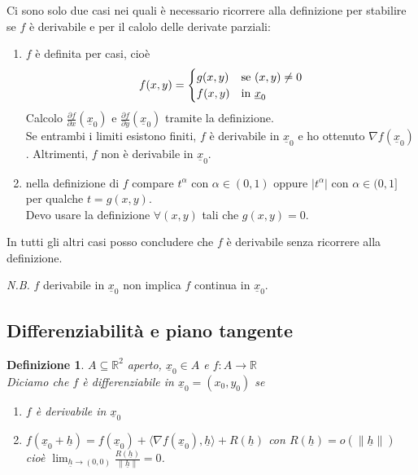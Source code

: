 \documentclass{scrreprt}
\newtheorem{defn}{Definizione}
\newenvironment{definition}{\begin{mdframed}[backgroundcolor=Ivory2]\begin{defn}}{\end{defn}\end{mdframed}}
\begin{document}
Ci sono solo due casi nei quali è necessario ricorrere alla definizione per stabilire se $f$ è derivabile e per il calolo delle derivate parziali:
\begin{enumerate}
	\item $f$ è definita per casi, cioè
	\begin{equation}
		f(x,y) = \begin{cases} g(x,y) & \textnormal{se } (x,y) \neq 0 \\ f(x,y) & \textnormal{in } \underline{x}_0 \end{cases}
	\end{equation}
	Calcolo $\frac{\partial f}{\partial x}(\underline{x}_0)$ e $\frac{\partial f}{\partial y}(\underline{x}_0)$ tramite la definizione.\\
	Se entrambi i limiti esistono finiti, $f$ è derivabile in $\underline{x}_0$ e ho ottenuto $\nabla f(\underline{x}_0)$.
	Altrimenti, $f$ non è derivabile in $\underline{x}_0$.
	\item nella definizione di $f$ compare $t^\alpha$ con $\alpha \in (0,1)$ oppure $\left\lvert t^{\alpha}\right\rvert $ con $\alpha \in (0,1]$ per qualche $t = g(x,y)$.\\
		Devo usare la definizione $\forall (x,y)$ tali che $g(x,y) = 0$.
\end{enumerate}
In tutti gli altri casi posso concludere che $f$ è derivabile senza ricorrere alla definizione.

\emph{N.B.} $f$ derivabile in $\underline{x}_0$ non implica $f$ continua in $\underline{x}_0$.

\subsection{Differenziabilità e piano tangente}
\begin{definition}
	$A \subseteq \mathbb{R}^2$ aperto, $\underline{x}_0 \in A$ e $f: A \to \mathbb{R}$\\
	Diciamo che $f$ è differenziabile in $\underline{x}_0 = (x_0, y_0)$ se 
	\begin{enumerate}
		\item[$(i)$] $f$ è derivabile in $\underline{x}_0$
		\item[$(ii)$] $f(\underline{x}_0 + \underline{h}) = f(\underline{x}_0) + \langle \nabla f(\underline{x}_0), \underline{h} \rangle + R(\underline{h})$ con $R(\underline{h}) = o(\left\lVert \underline{h}\right\rVert )$ cioè $\lim_{\underline{h} \to (0,0)} \frac{R(\underline{h})}{\left\lVert \underline{h}\right\rVert } = 0$.
	\end{enumerate}
\end{definition}
\end{document}
